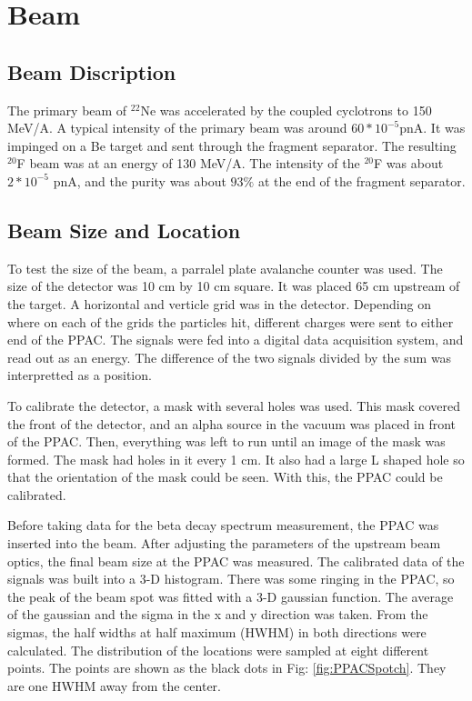 \section{Beam}

\subsection{Beam Discription}
The primary beam of $^{22}$Ne was accelerated by the coupled cyclotrons to 150 MeV/A. 
A typical intensity of the primary beam was around $60 * 10^{-5}$pnA.
It was impinged on a Be target and sent through the fragment separator. 
The resulting $^{20}$F beam was at an energy of 130 MeV/A. 
The intensity of the $^{20}$F was about $2 * 10^{-5}$ pnA, and the purity was about $93\%$ at the end of the fragment separator.

\subsection{Beam Size and Location}
To test the size of the beam, a parralel plate avalanche counter was used.
The size of the detector was 10 cm by 10 cm square. 
It was placed 65 cm upstream of the target.
A horizontal and verticle grid was in the detector.
Depending on where on each of the grids the particles hit, different charges were sent to either end of the PPAC.
The signals were fed into a digital data acquisition system, and read out as an energy.
The difference of the two signals divided by the sum was interpretted as a position.

To calibrate the detector, a mask with several holes was used. 
This mask covered the front of the detector, and an alpha source in the vacuum was placed in front of the PPAC.
Then, everything was left to run until an image of the mask was formed.
The mask had holes in it every 1 cm. 
It also had a large L shaped hole so that the orientation of the mask could be seen. 
With this, the PPAC could be calibrated.

Before taking data for the beta decay spectrum measurement, the PPAC was inserted into the beam.
After adjusting the parameters of the upstream beam optics, the final beam size at the PPAC was measured.
The calibrated data of the signals was built into a 3-D histogram.
There was some ringing in the PPAC, so the peak of the beam spot was fitted with a 3-D gaussian function.
The average of the gaussian and the sigma in the x and y direction was taken. 
From the sigmas, the half widths at half maximum (HWHM) in both directions were calculated. 
The distribution of the locations were sampled at eight different points. 
The points are shown as the black dots in Fig: \ref{fig:PPACSpotch}.
They are one HWHM away from the center. 

